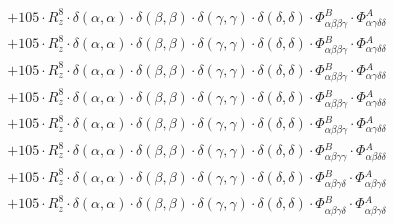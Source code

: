 \documentclass{article}
\begin{document}
\begin{subequations}
\begin{gather}
\begin{array}{c}
 \\[0.2em] 		 + 105 \cdot R_{z}^{8} \cdot \delta{}\left(\alpha{}, \alpha{}\right) \cdot \delta{}\left(\beta{}, \beta{}\right) \cdot \delta{}\left(\gamma{}, \gamma{}\right) \cdot \delta{}\left(\delta{}, \delta{}\right) \cdot \Phi{}^{B}_{\alpha{}\beta{}\beta{}\gamma{}} \cdot \Phi{}^{A}_{\alpha{}\gamma{}\delta{}\delta{}} 
 \\[0.2em] 		 + 105 \cdot R_{z}^{8} \cdot \delta{}\left(\alpha{}, \alpha{}\right) \cdot \delta{}\left(\beta{}, \beta{}\right) \cdot \delta{}\left(\gamma{}, \gamma{}\right) \cdot \delta{}\left(\delta{}, \delta{}\right) \cdot \Phi{}^{B}_{\alpha{}\beta{}\beta{}\gamma{}} \cdot \Phi{}^{A}_{\alpha{}\gamma{}\delta{}\delta{}} 
 \\[0.2em] 		 + 105 \cdot R_{z}^{8} \cdot \delta{}\left(\alpha{}, \alpha{}\right) \cdot \delta{}\left(\beta{}, \beta{}\right) \cdot \delta{}\left(\gamma{}, \gamma{}\right) \cdot \delta{}\left(\delta{}, \delta{}\right) \cdot \Phi{}^{B}_{\alpha{}\beta{}\beta{}\gamma{}} \cdot \Phi{}^{A}_{\alpha{}\gamma{}\delta{}\delta{}} 
 \\[0.2em] 		 + 105 \cdot R_{z}^{8} \cdot \delta{}\left(\alpha{}, \alpha{}\right) \cdot \delta{}\left(\beta{}, \beta{}\right) \cdot \delta{}\left(\gamma{}, \gamma{}\right) \cdot \delta{}\left(\delta{}, \delta{}\right) \cdot \Phi{}^{B}_{\alpha{}\beta{}\beta{}\gamma{}} \cdot \Phi{}^{A}_{\alpha{}\gamma{}\delta{}\delta{}} 
 \\[0.2em] 		 + 105 \cdot R_{z}^{8} \cdot \delta{}\left(\alpha{}, \alpha{}\right) \cdot \delta{}\left(\beta{}, \beta{}\right) \cdot \delta{}\left(\gamma{}, \gamma{}\right) \cdot \delta{}\left(\delta{}, \delta{}\right) \cdot \Phi{}^{B}_{\alpha{}\beta{}\beta{}\gamma{}} \cdot \Phi{}^{A}_{\alpha{}\gamma{}\delta{}\delta{}} 
 \\[0.2em] 		 + 105 \cdot R_{z}^{8} \cdot \delta{}\left(\alpha{}, \alpha{}\right) \cdot \delta{}\left(\beta{}, \beta{}\right) \cdot \delta{}\left(\gamma{}, \gamma{}\right) \cdot \delta{}\left(\delta{}, \delta{}\right) \cdot \Phi{}^{B}_{\alpha{}\beta{}\gamma{}\gamma{}} \cdot \Phi{}^{A}_{\alpha{}\beta{}\delta{}\delta{}} 
 \\[0.2em] 		 + 105 \cdot R_{z}^{8} \cdot \delta{}\left(\alpha{}, \alpha{}\right) \cdot \delta{}\left(\beta{}, \beta{}\right) \cdot \delta{}\left(\gamma{}, \gamma{}\right) \cdot \delta{}\left(\delta{}, \delta{}\right) \cdot \Phi{}^{B}_{\alpha{}\beta{}\gamma{}\delta{}} \cdot \Phi{}^{A}_{\alpha{}\beta{}\gamma{}\delta{}} 
 \\[0.2em] 		 + 105 \cdot R_{z}^{8} \cdot \delta{}\left(\alpha{}, \alpha{}\right) \cdot \delta{}\left(\beta{}, \beta{}\right) \cdot \delta{}\left(\gamma{}, \gamma{}\right) \cdot \delta{}\left(\delta{}, \delta{}\right) \cdot \Phi{}^{B}_{\alpha{}\beta{}\gamma{}\delta{}} \cdot \Phi{}^{A}_{\alpha{}\beta{}\gamma{}\delta{}} 

\end{array}
\end{gather}
\end{subequations}
\end{document}
